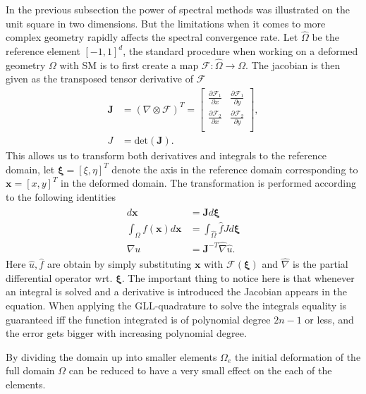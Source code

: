 In the previous subsection the power of spectral methods was illustrated on the unit square in two dimensions.
But the limitations when it comes to more complex geometry rapidly affects the spectral convergence rate. 
Let $\hat{\Omega}$ be the reference element $[-1,1]^d$,
the standard procedure when working on a deformed geometry $\Omega$ with SM is to first create a map $\mathcal{F}:\hat{\Omega}\rightarrow\Omega$.
The jacobian is then given as the transposed tensor derivative of $\mathcal{F}$
\begin{align}
    \mathbf{J} &= (\nabla \otimes \mathcal{F})^T =
\begin{bmatrix}
    \frac{\partial \mathcal{F}_1}{\partial x} &  \frac{\partial \mathcal{F}_1}{\partial y}  \\ 	
	\frac{\partial \mathcal{F}_2}{\partial x} &  \frac{\partial \mathcal{F}_2}{\partial y} \\ 	
\end{bmatrix},\\
J &= \text{det}(\mathbf{J}).
    \label{eq:jaobian}
\end{align}
This allows us to transform both derivatives and integrals to the reference domain, let $\boldsymbol\xi = [\xi,\eta]^T$ denote the axis in the reference 
domain corresponding to $\mathbf{x} = [x,y]^T$ in the deformed domain. The transformation is performed according to the following identities
\begin{align}
    \begin{split}
        d\mathbf{x} &= \mathbf{J}d\boldsymbol\xi \\
        \int_{\Omega}f(\mathbf{x})d\mathbf{x} &= \int_{\hat\Omega}\hat f J d\boldsymbol\xi \\
        \nabla u &= \mathbf{J}^{-T}\hat\nabla \hat u.
    \end{split}
    \label{eq:transforms}
\end{align}
Here $\hat u,\hat f$ are obtain by simply substituting $\mathbf{x}$ with $\mathcal{F}(\boldsymbol{\xi})$ and $\hat \nabla $ is the partial 
differential operator wrt. $\boldsymbol\xi$. The important thing to notice here is that whenever an integral is solved and a derivative is 
introduced the Jacobian appears in the equation. When applying the GLL-quadrature to solve the integrals equality is guaranteed iff the 
function integrated is of polynomial degree $2n-1$ or less, and the error gets bigger with increasing polynomial degree.

By dividing the domain up into smaller elements ${\Omega_e}$ the initial deformation of the full domain $\Omega$ 
can be reduced to have a very small effect on the each of the elements.


